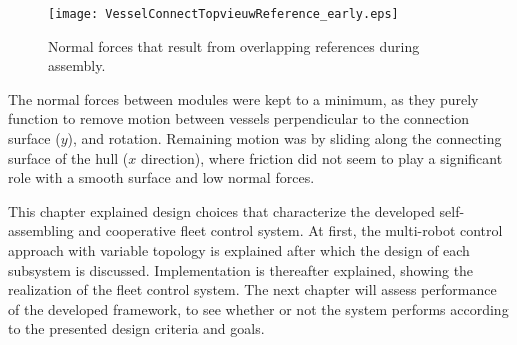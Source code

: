 \begin{figure}[H]
	\centering
	\texttt{[image: VesselConnectTopvieuwReference\_early.eps]}
	\caption{Normal forces that result from overlapping references during assembly.}
	\label{DelfiasNormalForceIntoPush2}
\end{figure}

The normal forces between modules were kept to a minimum, as they purely function to remove motion between vessels perpendicular to the connection surface ($y$), and rotation. Remaining motion was by sliding along the connecting surface of the hull ($x$ direction), where friction did not seem to play a significant role with a smooth surface and low normal forces. 



\vspace{15mm}

This chapter explained design choices that characterize the developed self-assembling and cooperative fleet control system. At first, the multi-robot control approach with variable topology is explained after which the design of each subsystem is discussed. Implementation is thereafter explained, showing the realization of the fleet control system. The next chapter will assess performance of the  developed framework, to see whether or not the system performs according to the presented design criteria and goals. 

